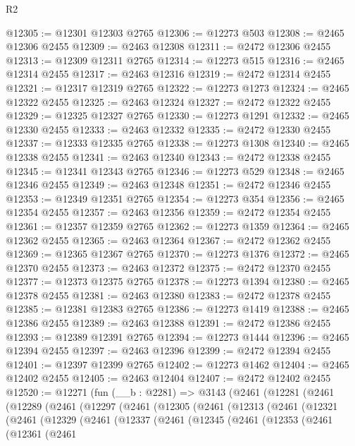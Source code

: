 \begin{lexlean}{R2}
\begin{coremodule}
@12305 := @12301 @12303 @2765
@12306 := @12273 @503
@12308 := @2465 @12306 @2455
@12309 := @2463 @12308
@12311 := @2472 @12306 @2455
@12313 := @12309 @12311 @2765
@12314 := @12273 @515
@12316 := @2465 @12314 @2455
@12317 := @2463 @12316
@12319 := @2472 @12314 @2455
@12321 := @12317 @12319 @2765
@12322 := @12273 @1273
@12324 := @2465 @12322 @2455
@12325 := @2463 @12324
@12327 := @2472 @12322 @2455
@12329 := @12325 @12327 @2765
@12330 := @12273 @1291
@12332 := @2465 @12330 @2455
@12333 := @2463 @12332
@12335 := @2472 @12330 @2455
@12337 := @12333 @12335 @2765
@12338 := @12273 @1308
@12340 := @2465 @12338 @2455
@12341 := @2463 @12340
@12343 := @2472 @12338 @2455
@12345 := @12341 @12343 @2765
@12346 := @12273 @529
@12348 := @2465 @12346 @2455
@12349 := @2463 @12348
@12351 := @2472 @12346 @2455
@12353 := @12349 @12351 @2765
@12354 := @12273 @354
@12356 := @2465 @12354 @2455
@12357 := @2463 @12356
@12359 := @2472 @12354 @2455
@12361 := @12357 @12359 @2765
@12362 := @12273 @1359
@12364 := @2465 @12362 @2455
@12365 := @2463 @12364
@12367 := @2472 @12362 @2455
@12369 := @12365 @12367 @2765
@12370 := @12273 @1376
@12372 := @2465 @12370 @2455
@12373 := @2463 @12372
@12375 := @2472 @12370 @2455
@12377 := @12373 @12375 @2765
@12378 := @12273 @1394
@12380 := @2465 @12378 @2455
@12381 := @2463 @12380
@12383 := @2472 @12378 @2455
@12385 := @12381 @12383 @2765
@12386 := @12273 @1419
@12388 := @2465 @12386 @2455
@12389 := @2463 @12388
@12391 := @2472 @12386 @2455
@12393 := @12389 @12391 @2765
@12394 := @12273 @1444
@12396 := @2465 @12394 @2455
@12397 := @2463 @12396
@12399 := @2472 @12394 @2455
@12401 := @12397 @12399 @2765
@12402 := @12273 @1462
@12404 := @2465 @12402 @2455
@12405 := @2463 @12404
@12407 := @2472 @12402 @2455
@12520 := @12271
    (fun (__b : @2281) =>
    @3143
      (@2461
        (@12281
          (@2461
            (@12289
              (@2461
                (@12297
                  (@2461
                    (@12305
                      (@2461
                        (@12313
                          (@2461
                            (@12321
                              (@2461
                                (@12329
                                  (@2461
                                    (@12337
                                      (@2461
                                        (@12345
                                          (@2461
                                            (@12353
                                              (@2461
                                                (@12361
                                                  (@2461

\end{coremodule}
\end{lexlean}
